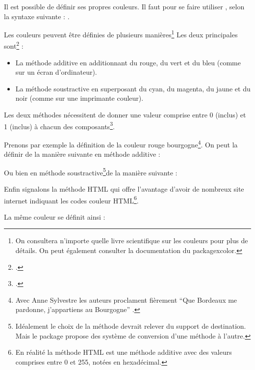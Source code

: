 Il est possible de définir ses propres couleurs. Il faut pour se faire utiliser , selon la syntaxe suivante : .


Les couleurs peuvent être définies de plusieurs manières\footnote{On consultera n'importe quelle livre scientifique sur les couleurs pour plus de détails. On peut également consulter la documentation du package{xcolor}.} Les deux principales sont\footcite[Il existe aussi la méthode de définition par la longueur d'onde pour les couleurs de l'arc en ciel, par pourcentage de gris pour les différents niveaux de gris, ainsi que par teinte, saturation et luminosité, mais ceci nécessiterait un cours de physique lumineuse. Pour  les personnes intéressées par les détails, consulter][]{xcolor_methode} :
\begin{itemize}
\item La méthode additive en additionnant du rouge, du vert et du bleu (comme sur un écran d'ordinateur).
\item La méthode soustractive en superposant du cyan, du magenta, du jaune et du noir (comme sur une imprimante couleur).
\end{itemize}


Les deux méthodes nécessitent de donner une valeur comprise entre 0 (inclus) et 1 (inclus) à chacun des composants\footcite[On pourra trouver une série de code couleur sur le site][]{codecouleur}.



Prenons par exemple la définition de la couleur \textcolor{rougebourgogne}{rouge bourgogne}\footnote{Avec Anne Sylvestre les auteurs proclament fièrement \enquote{Que Bordeaux me pardonne, j’appartiens au Bourgogne} \parencite{romaneconti}.}.
On peut la définir de la manière suivante en méthode additive :
\begin{latexcode}
\end{latexcode}

Ou bien en méthode soustractive\footnote{Idéalement le choix de  la méthode devrait relever du support de destination. Mais le package  propose des système de conversion d'une méthode à l'autre.}de la manière suivante :
\begin{latexcode}
\end{latexcode}

Enfin signalons la méthode HTML qui offre l'avantage d'avoir de nombreux site internet indiquant les codes couleur HTML\footnote{En réalité la méthode HTML est une méthode additive avec des valeurs comprises entre 0 et 255, notées en hexadécimal.}.

La même couleur se définit ainsi :

\begin{latexcode}
\end{latexcode}




